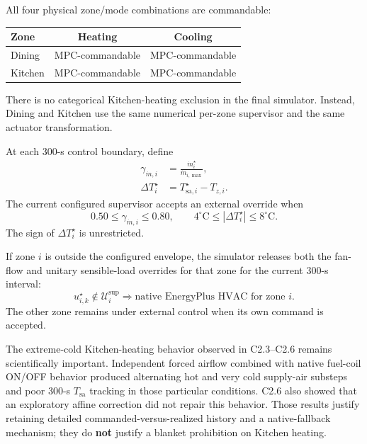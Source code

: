 \documentclass[11pt]{article}
\newcommand{\mdot}{\dot m}
\begin{document}
All four physical zone/mode combinations are commandable:
\begin{center}
\begin{tabular}{lcc}
\toprule
Zone & Heating & Cooling\\
\midrule
Dining & MPC-commandable & MPC-commandable\\
Kitchen & MPC-commandable & MPC-commandable\\
\bottomrule
\end{tabular}
\end{center}

There is no categorical Kitchen-heating exclusion in the final simulator.
Instead, Dining and Kitchen use the same numerical per-zone supervisor and the
same actuator transformation.

At each 300-s control boundary, define
\begin{align}
\gamma_{\dot m,i}
&=
\frac{\mdot_i^\star}{\mdot_{i,\max}},
\\
\Delta T_i^\star
&=
T_{\mathrm{sa},i}^\star-T_{z,i}.
\end{align}
The current configured supervisor accepts an external override when
\begin{equation}
\boxed{
0.50\le\gamma_{\dot m,i}\le0.80,
\qquad
4^\circ\mathrm C
\le
|\Delta T_i^\star|
\le
8^\circ\mathrm C.
}
\label{eq:supervisor-envelope}
\end{equation}
The sign of \(\Delta T_i^\star\) is unrestricted.

If zone \(i\) is outside the configured envelope, the simulator releases both
the fan-flow and unitary sensible-load overrides for that zone for the current
300-s interval:
\begin{equation}
\boxed{
u_{i,k}^{\star}\notin\mathcal U_i^{\mathrm{sup}}
\Longrightarrow
\text{native EnergyPlus HVAC for zone }i.
}
\label{eq:per-zone-fallback}
\end{equation}
The other zone remains under external control when its own command is accepted.

The extreme-cold Kitchen-heating behavior observed in C2.3--C2.6 remains
scientifically important.  Independent forced airflow combined with native
fuel-coil ON/OFF behavior produced alternating hot and very cold supply-air
substeps and poor 300-s \(T_{\mathrm{sa}}\) tracking in those particular
conditions.  C2.6 also showed that an exploratory affine correction did not
repair this behavior.  Those results justify retaining detailed
commanded-versus-realized history and a native-fallback mechanism; they do
\textbf{not} justify a blanket prohibition on Kitchen heating.
\end{document}
